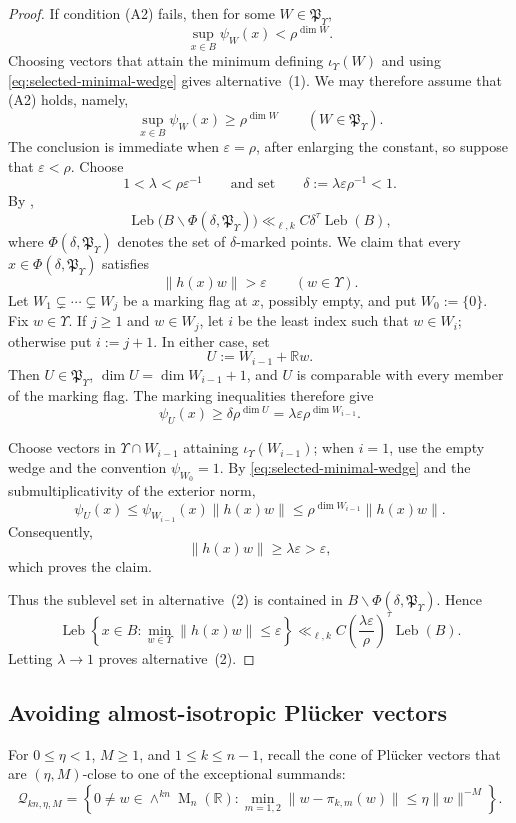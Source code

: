 \documentclass[reqno,11pt]{amsart}
\numberwithin{equation}{section}
\theoremstyle{definition}
\theoremstyle{remark}
\newcommand{\op}{\operatorname}
\newcommand{\M}{\op{M}}
\begin{document}
\begin{proof}
If condition (A2) fails, then for some
$W\in\mathfrak P_\Upsilon$,
$$
\sup_{x\in B}\psi_W(x)<\rho^{\dim W}.
$$
Choosing vectors that attain the minimum defining
$\iota_\Upsilon(W)$ and using
\eqref{eq:selected-minimal-wedge} gives alternative~(1).
We may therefore assume that (A2) holds, namely,
$$
\sup_{x\in B}\psi_W(x)\ge\rho^{\dim W}
\qquad(W\in\mathfrak P_\Upsilon).
$$
The conclusion is immediate when $\varepsilon=\rho$, after enlarging
the constant, so suppose that $\varepsilon<\rho$. Choose
$$
1<\lambda<{\rho}{\varepsilon}^{-1}
\qquad\text{and set}\qquad
\delta:={\lambda\varepsilon}{\rho}^{-1}<1.
$$
By \cite[Theorem~2.1]{kleinbock:2008},
$$
\operatorname{Leb}
\bigl(B\smallsetminus\Phi(\delta,\mathfrak P_\Upsilon)\bigr)
\ll_{\ell,k}
C\delta^\tau\operatorname{Leb}(B),
$$
where $\Phi(\delta,\mathfrak P_\Upsilon)$ denotes the set of
$\delta$-marked points.
We claim that every
$x\in\Phi(\delta,\mathfrak P_\Upsilon)$ satisfies
$$
\|h(x)w\|>\varepsilon
\qquad(w\in\Upsilon).
$$
Let
$W_1\subsetneq\cdots\subsetneq W_j$
be a marking flag at $x$, possibly empty, and put $W_0:=\{0\}$.
Fix $w\in\Upsilon$. If $j\ge1$ and $w\in W_j$, let $i$ be the least
index such that $w\in W_i$; otherwise put $i:=j+1$. In either case,
set
$$
U:=W_{i-1}+\mathbb Rw.
$$
Then $U\in\mathfrak P_\Upsilon$,
$\dim U=\dim W_{i-1}+1$, and $U$ is comparable with every member of
the marking flag. The marking inequalities therefore give
$$
\psi_U(x)
\ge
\delta\rho^{\dim U}
=
\lambda\varepsilon\rho^{\dim W_{i-1}}.
$$

Choose vectors in $\Upsilon\cap W_{i-1}$ attaining
$\iota_\Upsilon(W_{i-1})$; when $i=1$, use
the empty wedge and the convention
$\psi_{W_0}=1$. By
\eqref{eq:selected-minimal-wedge} and the submultiplicativity of the
exterior norm,
$$
\psi_U(x)
\le
\psi_{W_{i-1}}(x)\|h(x)w\|
\le
\rho^{\dim W_{i-1}}\|h(x)w\|.
$$
Consequently,
$$
\|h(x)w\|\ge\lambda\varepsilon>\varepsilon,
$$
which proves the claim.

Thus the sublevel set in alternative~(2) is contained in
$B\smallsetminus\Phi(\delta,\mathfrak P_\Upsilon)$. Hence
$$
\operatorname{Leb}\left\{
x\in B:
\min_{w\in\Upsilon}\|h(x)w\|\le\varepsilon
\right\}
\ll_{\ell,k}
C\left(\frac{\lambda\varepsilon}{\rho}\right)^\tau
\operatorname{Leb}(B).
$$
Letting $\lambda\to1$ proves alternative~(2).
\end{proof}



\subsection{Avoiding almost-isotropic Pl\"ucker vectors}
For $0\le\eta<1$, $M\ge1$, and $1\le k\le n-1$, recall the cone of Pl\"ucker vectors that are
$(\eta,M)$-close to one of the exceptional summands:
$$
\mathscr Q_{kn,\eta,M}
=
\left\{
0\ne w\in\wedge^{kn}\M_n(\mathbb R):
\min_{m=1,2}\|w-\pi_{k,m}(w)\|
\le \eta\|w\|^{-M}
\right\}.
$$
\end{document}
